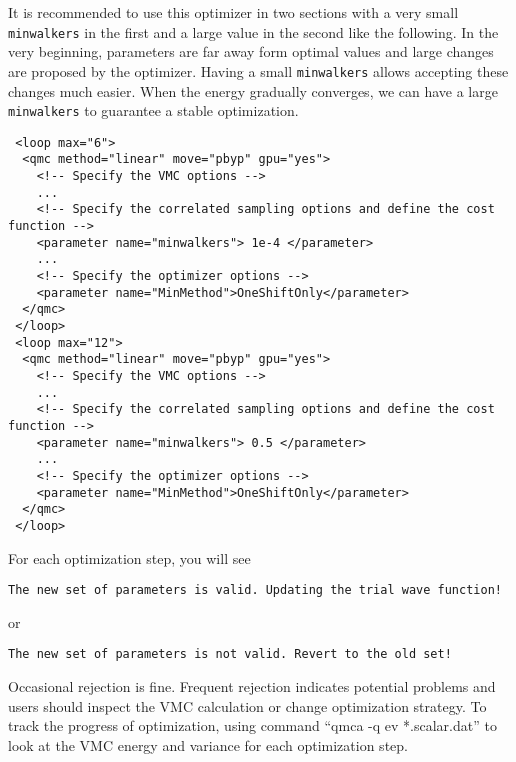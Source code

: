 It is recommended to use this optimizer in two sections with a very small \texttt{minwalkers} in the first and a large value in the second like the following.
In the very beginning, parameters are far away form optimal values and large changes are proposed by the optimizer.
Having a small \texttt{minwalkers} allows accepting these changes much easier.
When the energy gradually converges, we can have a large \texttt{minwalkers} to guarantee a stable optimization.
\begin{lstlisting}
 <loop max="6">
  <qmc method="linear" move="pbyp" gpu="yes">
    <!-- Specify the VMC options -->
    ...
    <!-- Specify the correlated sampling options and define the cost function -->
    <parameter name="minwalkers"> 1e-4 </parameter>
    ...
    <!-- Specify the optimizer options -->
    <parameter name="MinMethod">OneShiftOnly</parameter>
  </qmc>
 </loop>
 <loop max="12">
  <qmc method="linear" move="pbyp" gpu="yes">
    <!-- Specify the VMC options -->
    ...
    <!-- Specify the correlated sampling options and define the cost function -->
    <parameter name="minwalkers"> 0.5 </parameter>
    ...
    <!-- Specify the optimizer options -->
    <parameter name="MinMethod">OneShiftOnly</parameter>
  </qmc>
 </loop>
\end{lstlisting}

For each optimization step, you will see
\begin{lstlisting}
The new set of parameters is valid. Updating the trial wave function!
\end{lstlisting}
or
\begin{lstlisting}
The new set of parameters is not valid. Revert to the old set!
\end{lstlisting}
Occasional rejection is fine. Frequent rejection indicates potential problems and users should inspect the VMC calculation or change optimization strategy.
To track the progress of optimization, using command ``qmca -q ev *.scalar.dat'' to look at the VMC energy and variance for each optimization step.

